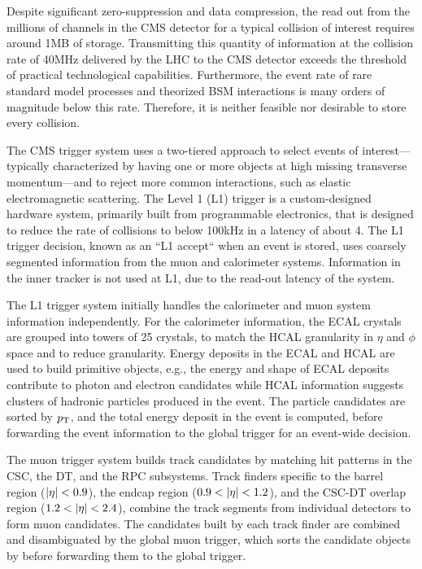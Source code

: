 Despite significant zero-suppression and data compression, the
read out from the millions of channels in the CMS detector for
a typical \pp collision of interest requires around
1\unit{MB} of storage.
Transmitting this quantity of information 
at the collision rate of 40\unit{MHz} delivered by the LHC to the CMS detector 
exceeds the threshold of practical technological capabilities. Furthermore,
the event rate of rare standard model processes and theorized BSM interactions
is many orders of magnitude below this rate. 
Therefore, it is neither feasible 
nor desirable to store every collision.

The CMS trigger system uses a two-tiered approach to select events of 
interest---typically characterized by having one or more objects
at high missing transverse momentum---and to reject more common \pp 
interactions, such as elastic electromagnetic scattering.
The Level 1 (L1) trigger is a custom-designed hardware system,
primarily built from programmable electronics, that
is designed to reduce the rate of collisions to below 100\unit{kHz}
in a latency of about 4\mus. The L1 trigger decision,
known as an ``L1 accept`` when an event is stored,
uses coarsely segmented
information from the muon and calorimeter systems.
Information in the inner tracker is not used at L1, due to the read-out
latency of the system. 

The L1 trigger system initially handles the calorimeter and muon system
information independently. For the calorimeter information, the ECAL crystals
are grouped into towers of 25 crystals, to match the HCAL granularity
in $\eta$ and $\phi$ space and to reduce granularity. Energy deposits in
the ECAL and HCAL are used to build primitive objects, e.g., 
the energy and shape of ECAL deposits
contribute to photon and electron candidates while HCAL information
suggests clusters of hadronic particles produced in the event.
The particle candidates are sorted by $p_{\mathrm{T}}$, and the total energy deposit
in the event is computed, before forwarding the event information to
the global trigger for an event-wide decision.

The muon trigger system builds track candidates by matching hit
patterns in the CSC, the DT, and the RPC subsystems. Track finders
specific to the barrel region ($\lvert \eta \rvert < 0.9$), the endcap region
($0.9 < \lvert \eta \rvert < 1.2$), and the CSC-DT overlap region ($1.2 < \lvert \eta \rvert < 2.4$),
combine the track segments from individual detectors to form muon
candidates. The candidates built by each track finder are combined
and disambiguated by the global muon trigger, which sorts the 
candidate objects by \pt before forwarding them to the global trigger.

